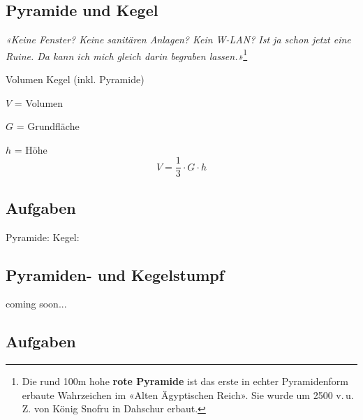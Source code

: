 \subsection{Pyramide und Kegel}

\begin{center}
{\textit{«Keine Fenster? Keine sanitären Anlagen? Kein W-LAN? Ist ja schon
jetzt eine Ruine. Da kann ich mich gleich darin begraben
lassen.»}}\footnote{Die rund 100m hohe \textbf{rote Pyramide} ist das
  erste in echter Pyramidenform erbaute Wahrzeichen im «Alten
  Ägyptischen Reich». Sie wurde um 2500 v.\,u.\,Z. von König Snofru in
Dahschur erbaut.}
\end{center}


\begin{gesetz}{Volumen Kegel (inkl. Pyramide)}{}
  
  $V$ = Volumen
  
  $G$ = Grundfläche

  $h$ = Höhe
  $$V = \frac13\cdot{}G\cdot{}h$$
  \end{gesetz}

\subsection*{Aufgaben}
Pyramide:
Kegel:
\newpage

\subsection{Pyramiden- und Kegelstumpf}
coming soon...
\subsection*{Aufgaben}
\newpage
